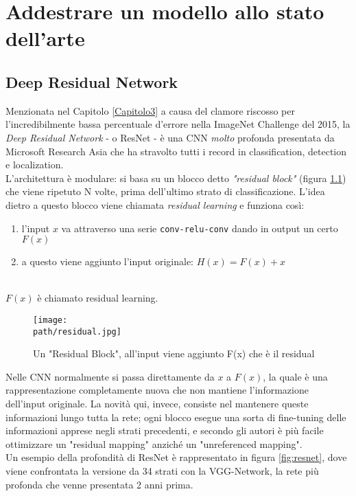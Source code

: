 \chapter{Addestrare un modello allo stato dell'arte} %
\label{Capitolo5} %
\def \path {Figures/C5}
\section{Deep Residual Network}
Menzionata nel Capitolo \ref{Capitolo3} a causa del clamore riscosso per l'incredibilmente bassa percentuale d'errore nella ImageNet Challenge del 2015, la \emph{Deep Residual Network} - o ResNet - è una CNN \emph{molto} profonda presentata da Microsoft Research Asia\parencite{resnet} che ha stravolto tutti i record in classification, detection e localization. 
\\ 
L'architettura è modulare: si basa su un blocco detto \emph{"residual block"} (figura \ref{fig:residual}) che viene ripetuto N volte, prima dell'ultimo strato di classificazione. L'idea dietro a questo blocco viene chiamata \emph{residual learning} e funziona così: 
\begin{enumerate}
\item l'input $x$ va attraverso una serie \texttt{conv-relu-conv} dando in output un certo $F(x)$
\item a questo viene aggiunto l'input originale: $H(x) = F(x) + x$
\end{enumerate}\\ 
$F(x)$ è chiamato residual learning. 
\begin{figure}[h!]
 \centering
 \texttt{[image: \\path/residual.jpg]} 
 \caption{Un "Residual Block", all'input viene aggiunto F(x) che è il residual}
 \label{fig:residual}
\end{figure}

Nelle CNN normalmente si passa direttamente da $x$ a $F(x)$, la quale è una rappresentazione completamente nuova che non mantiene l'informazione dell'input originale. La novità qui, invece, consiste nel mantenere queste informazioni lungo tutta la rete; ogni blocco esegue una sorta di fine-tuning delle informazioni apprese negli strati precedenti, e secondo gli autori è più facile ottimizzare un "residual mapping" anziché un "unreferenced mapping". 
\\
Un esempio della profondità di ResNet è rappresentato in figura \ref{fig:resnet}, dove viene confrontata la versione da 34 strati con la VGG-Network, la rete più profonda che venne presentata 2 anni prima. 

